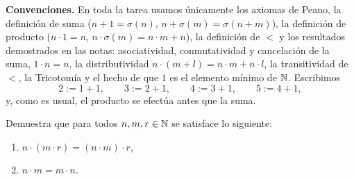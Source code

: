 \documentclass[12pt,a4paper]{article}
\begin{document}
    \thispagestyle{empty}
    

    \textbf{Convenciones.} En toda la tarea usamos únicamente los axiomas de Peano, la definición de suma
    ($n+1=\sigma(n)$, $n+\sigma(m)=\sigma(n+m)$), la definición de producto ($n\cdot1=n$, $n\cdot\sigma(m)=n\cdot m+n$),
    la definición de $<$ y los resultados demostrados en las notas: asociatividad, conmutatividad y cancelación de la suma,
    $1\cdot n=n$, la distributividad $n\cdot(m+l)=n\cdot m+n\cdot l$, la transitividad de $<$, la Tricotomía y el
    hecho de que $1$ es el elemento mínimo de $\mathbb{N}$. Escribimos
    \begin{equation*}
        2:=1+1,\qquad 3:=2+1,\qquad 4:=3+1,\qquad 5:=4+1,
    \end{equation*}
    y, como es usual, el producto se efectúa antes que la suma.

    \begin{problema}
        Demuestra que para todos $n,m,r\in\mathbb{N}$ se satisface lo siguiente:
        \begin{enumerate}[label=\alph*)]
            \item $n\cdot(m\cdot r)=(n\cdot m)\cdot r$,
            \item $n\cdot m=m\cdot n$.
        \end{enumerate}
    \end{problema}
\end{document}
